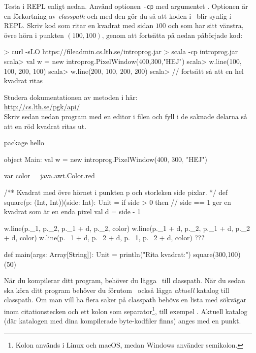 \Subtask Testa  i REPL enligt nedan. Använd optionen \texttt{-cp} med argumentet \LibJar. Optionen  är en förkortning av \emph{classpath} och med den gör du så att koden i \LibJar~blir synlig i REPL.  Skriv kod som ritar en kvadrat med sidan $100$ och som har sitt vänstra, övre hörn i punkten $(100,100)$, genom att fortsätta på nedan påbörjade kod: 

\begin{REPL}
> curl -sLO https://fileadmin.cs.lth.se/introprog.jar
> scala -cp introprog.jar
scala> val w = new introprog.PixelWindow(400,300,"HEJ")
scala> w.line(100, 100, 200, 100)
scala> w.line(200, 100, 200, 200)
scala> // fortsätt så att en hel kvadrat ritas
\end{REPL}

\Subtask Studera dokumentationen av metoden  i  här:\\ \url{http://cs.lth.se/pgk/api/}
\\ Skriv sedan nedan program med en editor i filen  och fyll i de saknade delarna så att en röd kvadrat ritas ut.

\begin{Code}
package hello

object Main:
  val w = new introprog.PixelWindow(400, 300, "HEJ")

  var color = java.awt.Color.red

  /** Kvadrat med övre hörnet i punkten p och storleken side pixlar. */
  def square(p: (Int, Int))(side: Int): Unit =
    if side > 0 then
      // side == 1 ger en kvadrat som är en enda pixel
      val d = side - 1  

      w.line(p._1,     p._2,     p._1 + d, p._2,     color)
      w.line(p._1 + d, p._2,     p._1 + d, p._2 + d, color)
      w.line(p._1 + d, p._2 + d, p._1,     p._2 + d, color)
      ???

  def main(args: Array[String]): Unit =
    println("Rita kvadrat:")
    square(300,100)(50)
\end{Code}

\noindent
När du kompilerar ditt program, behöver du lägga \LibJar~till classpath.
När du sedan ska köra ditt program behöver du förutom  \LibJar~också lägga \emph{aktuell} katalog till classpath. Om man vill ha flera saker på classpath behövs en lista med sökvägar inom citationstecken och ett kolon som separator\footnote{Kolon används i Linux och macOS, medan Windows använder semikolon.}, till exempel .
Aktuell katalog (där katalogen  med dina kompilerade byte-kodfiler finns) anges med en punkt.

